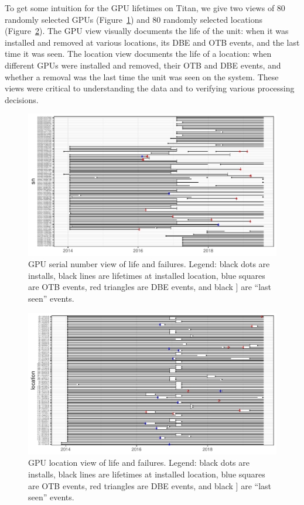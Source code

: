 To get some intuition for the GPU lifetimes on Titan, we give two
views of 80 randomly selected GPUs (Figure~\ref{fig:gpuview}) and 80
randomly selected locations (Figure~\ref{fig:locview}). The GPU view
visually documents the life of the unit: when it was installed and
removed at various locations, its DBE and OTB events, and the last
time it was seen. The location view documents the life of a location:
when different GPUs were installed and removed, their OTB and DBE
events, and whether a removal was the last time the unit was seen on
the system. These views were critical to understanding the data and to
verifying various processing decisions.
\begin{figure}[tb]
  \includegraphics[width=6.5in]{figs/sample_sn.pdf}
  \caption{GPU serial number view of life and failures. Legend: black
    dots are installs, black lines are lifetimes at installed
    location, blue squares are OTB events, red triangles are DBE
    events, and black ] are ``last seen'' events.}
  \label{fig:gpuview}
\end{figure}
\begin{figure}[tb]
  \includegraphics[width=6.5in]{figs/sample_loc.pdf}
  \caption{GPU location view of life and failures.  Legend: black
    dots are installs, black lines are lifetimes at installed
    location, blue squares are OTB events, red triangles are DBE
    events, and black ] are ``last seen'' events.}
  \label{fig:locview}
\end{figure}

